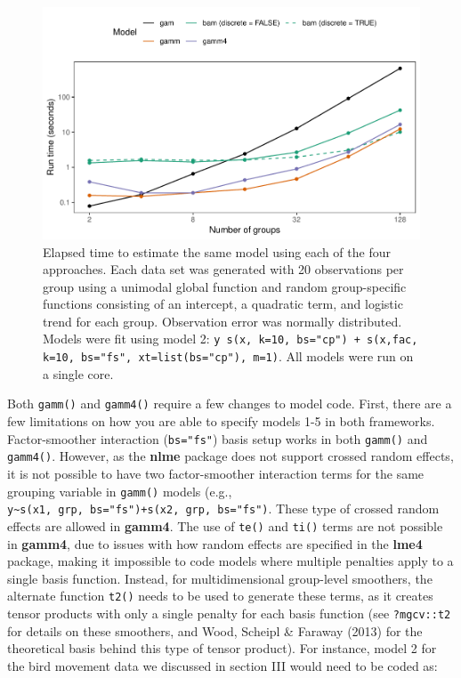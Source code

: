 \documentclass[12pt]{article}
\begin{document}
\begin{figure}
\centering
\includegraphics{../figures/alt_model_timing_plot-1.pdf}
\caption{\label{fig:alt_timing}Elapsed time to estimate the same model
using each of the four approaches. Each data set was generated with 20
observations per group using a unimodal global function and random
group-specific functions consisting of an intercept, a quadratic term,
and logistic trend for each group. Observation error was normally
distributed. Models were fit using model 2:
\texttt{y~s(x, k=10, bs="cp") + s(x,fac, k=10, bs="fs", xt=list(bs="cp"), m=1)}.
All models were run on a single core.}
\end{figure}

Both \texttt{gamm()} and \texttt{gamm4()} require a few changes to model
code. First, there are a few limitations on how you are able to specify
models 1-5 in both frameworks. Factor-smoother interaction
(\texttt{bs="fs"}) basis setup works in both \texttt{gamm()} and
\texttt{gamm4()}. However, as the \textbf{nlme} package does not support
crossed random effects, it is not possible to have two factor-smoother
interaction terms for the same grouping variable in \texttt{gamm()}
models (e.g.,
\texttt{y\textasciitilde{}s(x1,\ grp,\ bs="fs")+s(x2,\ grp,\ bs="fs")}.
These type of crossed random effects are allowed in \textbf{gamm4}. The
use of \texttt{te()} and \texttt{ti()} terms are not possible in
\textbf{gamm4}, due to issues with how random effects are specified in
the \textbf{lme4} package, making it impossible to code models where
multiple penalties apply to a single basis function. Instead, for
multidimensional group-level smoothers, the alternate function
\texttt{t2()} needs to be used to generate these terms, as it creates
tensor products with only a single penalty for each basis function (see
\texttt{?mgcv::t2} for details on these smoothers, and Wood, Scheipl \&
Faraway (2013) for the theoretical basis behind this type of tensor
product). For instance, model 2 for the bird movement data we discussed
in section III would need to be coded as:
\end{document}
